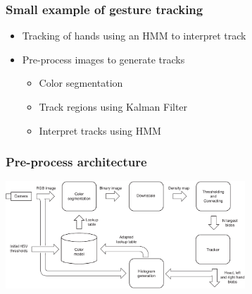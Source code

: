 \documentclass[10pt]{beamer}
\begin{document}
\begin{frame}
  \frametitle{Small example of gesture tracking}
  \begin{itemize}
  \item Tracking of hands using an HMM to interpret track
  \item Pre-process images to generate tracks
    \begin{itemize}
    \item Color segmentation
    \item Track regions using Kalman Filter
    \item Interpret tracks using HMM
    \end{itemize}
  \end{itemize}
\end{frame}

\begin{frame}
  \frametitle{Pre-process architecture}
  \begin{center}
    \includegraphics[width=9cm]{gesture-pre-process}
  \end{center}
\end{frame}
\end{document}
